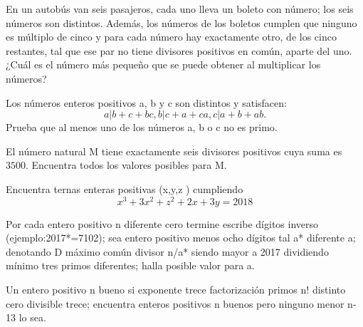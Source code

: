 \begin{problem}[OMMEB 2017]
    En un autobús van seis pasajeros, cada uno lleva un boleto 
    con número; los seis números son distintos. Además,
    los números de los boletos cumplen que ninguno es múltiplo 
    de cinco y para cada número hay exactamente otro, de los 
    cinco restantes, tal que ese par no tiene divisores positivos 
    en común, aparte del uno. ¿Cuál es el número más pequeño que 
    se puede obtener al multiplicar los números?
\end{problem}

\begin{problem}[OMMEB 2017]
    Los números enteros positivos a, b y c son distintos y 
    satisfacen:
    \[ 
    a|b + c + bc,
    b|c + a + ca,
    c|a + b + ab.
    \]
    Prueba que al menos uno de los números a, b o c no es primo.
\end{problem}

\begin{problem}[OMMEB 2017]
    El número natural M tiene exactamente seis divisores positivos 
    cuya suma es \(3500\). Encuentra todos los valores posibles para M.
\end{problem}

\begin{problem}[OMMEB 2017]
    Encuentra ternas enteras positivas (x,y,z ) cumpliendo 
    \[x^3+3x^2+z^2+2x+3y=2018\]
\end{problem}

\begin{problem}[OMMEB 2017]
    Por cada entero positivo n diferente cero termine escribe 
    dígitos inverso (ejemplo:2017*=7102); sea entero positivo menos 
    ocho dígitos tal a* diferente a; denotando D máximo común divisor 
    n/a* siendo mayor a 2017 dividiendo mínimo tres primos diferentes; 
    halla posible valor para a.  
\end{problem}

\begin{problem}[OMMEB 2017]
    Un entero positivo n bueno si exponente trece factorización 
    primos n! distinto cero divisible trece; encuentra enteros 
    positivos n buenos pero ninguno menor n-13 lo sea.
\end{problem}   
 